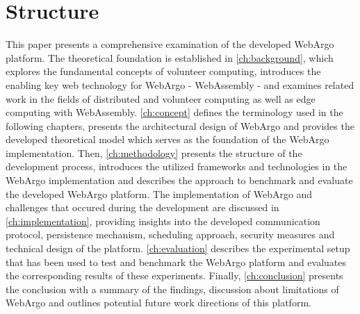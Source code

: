 \section{Structure}
\label{sec:intro:structure}
This paper presents a comprehensive examination of the developed WebArgo platform. The theoretical foundation is established in \autoref{ch:background}, which explores the fundamental concepts of volunteer computing, introduces the enabling key web technology for WebArgo - WebAssembly - and examines related work in the fields of distributed and volunteer computing as well as edge computing with WebAssembly. \autoref{ch:concept} defines the terminology used in the following chapters, presents the architectural design of WebArgo and provides the developed theoretical model which serves as the foundation of the WebArgo implementation. Then, \autoref{ch:methodology} presents the structure of the development process, introduces the utilized frameworks and technologies in the WebArgo implementation and describes the approach to benchmark and evaluate the developed WebArgo platform. The implementation of WebArgo and challenges that occured during the development are discussed in \autoref{ch:implementation}, providing insights into the developed communication protocol, persistence mechanism, scheduling approach, security measures and technical design of the platform. \autoref{ch:evaluation} describes the experimental setup that has been used to test and benchmark the WebArgo platform and evaluates the corresponding results of these experiments. Finally, \autoref{ch:conclusion} presents the conclusion with a summary of the findings, discussion about limitations of WebArgo and outlines potential future work directions of this platform.